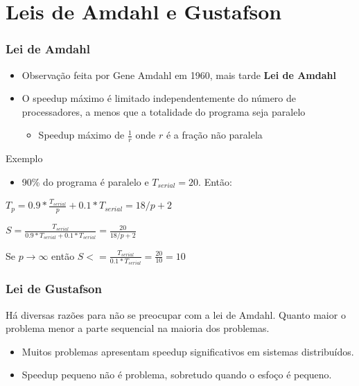 \documentclass[xcolor={usenames,dvipsnames},12pt,presentation,aspectratio=169]{beamer}
\begin{document}
\section{Leis de Amdahl e Gustafson}
\begin{frame}[fragile]
  \frametitle{Lei de Amdahl}
\begin{itemize}
  \item Observação feita por Gene Amdahl em 1960, mais tarde \textbf{Lei de Amdahl}
    \item O speedup máximo é limitado independentemente do número de processadores, 
  a menos que a totalidade do programa seja paralelo
  \begin{itemize}
    \item Speedup máximo de $\frac{1}{r}$ onde $r$ é a fração não paralela
  \end{itemize}
\end{itemize}
\begin{exampleblock}{Exemplo}
\begin{itemize}
  \item 90\% do programa é paralelo e $T_{serial} = 20$. Então:
\end{itemize}
\vspace{2mm}
$T_p = 0.9 * \frac{T_{serial}}{p} + 0.1 * T_{serial}  = 18/p + 2$

\vspace{2mm}
$S = \frac{T_{serial}}{0.9 * T_{serial} + 0.1 * T_{serial}}  = \frac{20}{18/p + 2}$

\vspace{2mm}
Se $p \rightarrow \infty$ então $S <= \frac{T_{serial}}{0.1 * T_{serial}} = \frac{20}{10} = 10$
\end{exampleblock}
\end{frame}
\begin{frame}[fragile]
  \frametitle{Lei de Gustafson}
  Há diversas razões para não se preocupar com a lei de Amdahl. Quanto maior o problema menor a parte sequencial na maioria dos problemas.
\begin{itemize}
  \item Muitos problemas apresentam speedup significativos em sistemas distribuídos.
  \item Speedup pequeno não é problema, sobretudo quando o esfoço é pequeno.
\end{itemize}
\end{frame}
\end{document}
